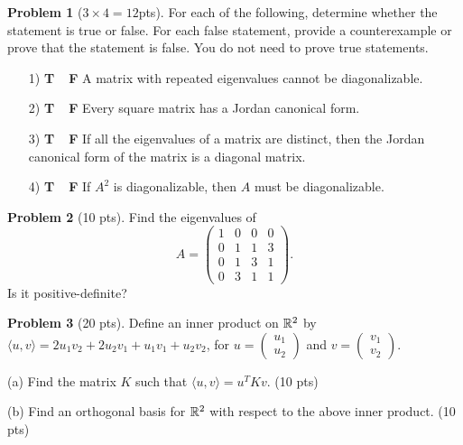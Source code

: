 \documentclass[12pt]{amsart}
\theoremstyle{definition}
\newtheorem{prob}{Problem}
\begin{document}
\begin{prob}[$3\times 4 = 12$pts]For each of the following, determine whether the statement is true or false. For
each false statement, provide a counterexample or prove that the statement is false. You do
not need to prove true statements.	\begin{enumerate}
		\item[1)  {\bf T\ \  F}]\quad   A matrix with repeated eigenvalues cannot be diagonalizable.
		\vspace{5cm}
		
		\item[2)  {\bf T\ \  F}]\quad Every square matrix has a Jordan canonical form.

\vspace{5cm}
		
		\item[3)  {\bf T\ \  F}]\quad If all the eigenvalues of a matrix are distinct, then the Jordan canonical form of the matrix is a diagonal matrix.\vspace{5cm}
		\item[4)  {\bf T\ \  F}]\quad If $A^2$ is diagonalizable, then $A$ must be diagonalizable.	\end{enumerate}
\end{prob}

\newpage

\begin{prob}[10 pts]
	Find the eigenvalues of
	$$
	A=\begin{pmatrix}
		1&0&0&0\\0&1&1&3\\0&1&3&1\\0&3&1&1
	\end{pmatrix}.
	$$
	Is it positive-definite?
\end{prob}

\newpage

\begin{prob}[20 pts]
	Define an inner product on $\mathbb{R}^2$ by $\langle u,v\rangle=2u_1v_2+2u_2v_1+u_1v_1+u_2v_2$, for $u=\begin{pmatrix}
		u_1\\u_2
	\end{pmatrix}$ and $v=\begin{pmatrix}
		v_1\\v_2
	\end{pmatrix}$. 
	
	(a) Find the matrix $K$ such that $\langle u,v\rangle = u^TKv$. (10 pts)\vspace{8cm}
	
		
	(b) Find an orthogonal basis for $\mathbb{R}^2$ with respect to the above inner product. (10 pts) 
	
	
\end{prob}
\end{document}
